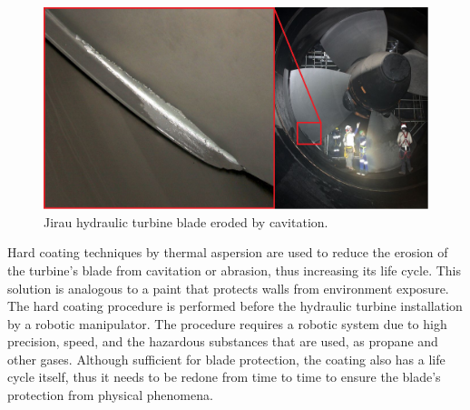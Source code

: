 \begin{figure}[h!]	
	\includegraphics[width=\columnwidth]{figs/intro/cavitacao2}
	\caption{Jirau hydraulic turbine blade eroded by cavitation.}
	\label{fig::cavitacao}
\end{figure}

Hard coating techniques by thermal aspersion
are used to reduce the erosion of the turbine's blade from cavitation or
abrasion, thus increasing its life cycle. This solution is analogous to a paint
that protects walls from environment exposure. The hard coating procedure is performed
before the hydraulic turbine installation by a robotic manipulator. The
procedure requires a robotic system due to high precision, speed, and
the hazardous substances that are used, as propane and other gases.
Although sufficient for blade protection, the coating also has a life
cycle itself, thus it needs to be redone from time to time to ensure the
blade's protection from physical phenomena.

